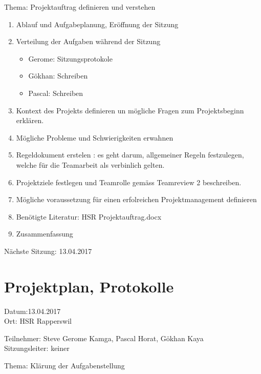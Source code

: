Thema: Projektauftrag definieren und verstehen
\begin{enumerate}

\item Ablauf und Aufgabeplanung, Eröffnung der Sitzung 

\item  Verteilung der Aufgaben während der Sitzung
\begin{itemize}
\item Gerome: Sitzungsprotokole
\item Gökhan: Schreiben
\item Pascal: Schreiben 
\end{itemize}

\item Kontext des Projekts definieren un mögliche Fragen zum Projektsbeginn erklären.

\item Mögliche Probleme und Schwierigkeiten erwahnen

\item Regeldokument erstelen : es geht darum, allgemeiner Regeln festzulegen, welche für die Teamarbeit als verbinlich gelten.

\item Projektziele festlegen und Teamrolle gemäss Teamreview 2 beschreiben.

\item Mögliche voraussetzung für einen erfolreichen Projektmanagement definieren

\item Benötigte Literatur: HSR Projektauftrag.docx   

\item Zusammenfassung

\end{enumerate}

Nächste Sitzung: 13.04.2017




\newpage

\section*{Projektplan, Protokolle}

Datum:13.04.2017\\
Ort: HSR Rapperswil

Teilnehmer: Steve Gerome Kamga, Pascal Horat, Gökhan Kaya\\
Sitzungsleiter: keiner

Thema: Klärung der Aufgabenstellung


